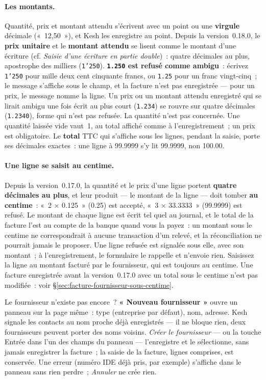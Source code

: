 \documentclass[a4paper,11pt,oneside]{article}
\begin{document}
\paragraph{Les montants.} Quantité, prix et montant attendu s'écrivent avec un point ou une
\textbf{virgule} décimale («~12,50~»), et Kesh les enregistre au point. Depuis la version~0.18.0,
le \textbf{prix unitaire} et le \textbf{montant attendu} se lisent comme le montant d'une écriture
(cf. \emph{Saisie d'une écriture en partie double})~: quatre décimales au plus, apostrophe des
milliers (\texttt{1'250}). \textbf{\texttt{1.250} est refusé comme ambigu}~: écrivez
\texttt{1'250} pour mille deux cent cinquante francs, ou \texttt{1.25} pour un franc vingt-cinq~;
le message s'affiche sous le champ, et la facture n'est pas enregistrée --- pour un prix, le
message nomme la ligne. Un prix ou un montant attendu enregistré qui se lirait ambigu une fois
écrit au plus court (\texttt{1.234}) se rouvre sur quatre décimales (\texttt{1.2340}), forme qui
n'est pas refusée. La quantité n'est pas concernée. Une quantité laissée vide vaut~1, au total
affiché comme à l'enregistrement~; un prix est obligatoire. Le \textbf{total} TTC qui s'affiche sous les lignes, pendant la saisie, porte ses
décimales exactes~: une ligne à 99.9999 s'y lit 99.9999, non 100.00.

\paragraph{Une ligne se saisit au centime.} Depuis la version~0.17.0, la quantité et le prix
d'une ligne portent \textbf{quatre décimales au plus}, et leur produit --- le montant de la
ligne --- doit tomber \textbf{au centime}~: «~2 × 0.125~» (0.25) est accepté, «~3 × 33.3333~»
(99.9999) est refusé. Le montant de chaque ligne est écrit tel quel au journal, et le total de
la facture l'est au compte de la banque quand vous la payez~: un montant sous le centime ne
correspondrait à aucune transaction d'un relevé, et la réconciliation ne pourrait jamais le
proposer. Une ligne refusée est signalée sous elle, avec son montant~; à l'enregistrement, le
formulaire le rappelle et n'envoie rien. Saisissez la ligne au montant facturé par le
fournisseur, qui est toujours au centime. Une facture enregistrée avant la version~0.17.0 avec
un total sous le centime n'est pas modifiée~: voir \S\ref{sec:facture-fournisseur-sous-centime}.

Le fournisseur n'existe pas encore~? \textbf{« Nouveau fournisseur »} ouvre un panneau
sur la page même~: type (entreprise par défaut), nom, adresse. Kesh signale les contacts
au nom proche déjà enregistrés --- il ne bloque rien, deux fournisseurs peuvent porter des
noms voisins. \emph{Créer le fournisseur} --- ou la touche Entrée dans l'un des champs du
panneau --- l'enregistre et le sélectionne, sans jamais enregistrer la facture~; la saisie
de la facture, lignes comprises, est conservée. Une erreur (numéro IDE déjà pris, par exemple)
s'affiche dans le panneau sans rien perdre~; \emph{Annuler} ne crée rien.
\end{document}
